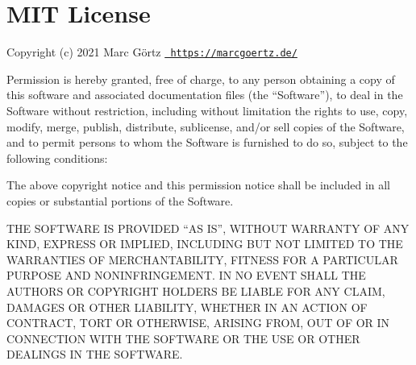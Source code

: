 \chapter{MIT License}
\hypertarget{md_pkiclassroomrescheduler_2src_2main_2frontend_2node__modules_2postcss-opacity-percentage_2_l_i_c_e_n_s_e}{}\label{md_pkiclassroomrescheduler_2src_2main_2frontend_2node__modules_2postcss-opacity-percentage_2_l_i_c_e_n_s_e}
\label{md_pkiclassroomrescheduler_2src_2main_2frontend_2node__modules_2postcss-opacity-percentage_2_l_i_c_e_n_s_e_autotoc_md19227}%
%
 Copyright (c) 2021 Marc Görtz \href{https://marcgoertz.de/}{\texttt{ https\+://marcgoertz.\+de/}}

Permission is hereby granted, free of charge, to any person obtaining a copy of this software and associated documentation files (the “\+Software”), to deal in the Software without restriction, including without limitation the rights to use, copy, modify, merge, publish, distribute, sublicense, and/or sell copies of the Software, and to permit persons to whom the Software is furnished to do so, subject to the following conditions\+:

The above copyright notice and this permission notice shall be included in all copies or substantial portions of the Software.

THE SOFTWARE IS PROVIDED “\+AS IS”, WITHOUT WARRANTY OF ANY KIND, EXPRESS OR IMPLIED, INCLUDING BUT NOT LIMITED TO THE WARRANTIES OF MERCHANTABILITY, FITNESS FOR A PARTICULAR PURPOSE AND NONINFRINGEMENT. IN NO EVENT SHALL THE AUTHORS OR COPYRIGHT HOLDERS BE LIABLE FOR ANY CLAIM, DAMAGES OR OTHER LIABILITY, WHETHER IN AN ACTION OF CONTRACT, TORT OR OTHERWISE, ARISING FROM, OUT OF OR IN CONNECTION WITH THE SOFTWARE OR THE USE OR OTHER DEALINGS IN THE SOFTWARE. 